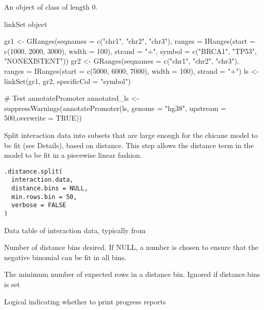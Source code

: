 \documentclass[letterpaper]{book}
\begin{document}
%
\begin{Format}
An object of class  of length 0.
\end{Format}
%
\begin{Value}
linkSet object
\end{Value}
%
\begin{Examples}
\begin{ExampleCode}
  gr1 <- GRanges(seqnames = c("chr1", "chr2", "chr3"),
                ranges = IRanges(start = c(1000, 2000, 3000), width = 100),
                strand = "+", symbol = c("BRCA1", "TP53", "NONEXISTENT"))
  gr2 <- GRanges(seqnames = c("chr1", "chr2", "chr3"),
                ranges = IRanges(start = c(5000, 6000, 7000), width = 100),
                strand = "+")
  ls <- linkSet(gr1, gr2, specificCol = "symbol")

  # Test annotatePromoter
  annotated_ls <- suppressWarnings(annotatePromoter(ls, genome = "hg38", upstream = 500,overwrite = TRUE))


\end{ExampleCode}
\end{Examples}
%
\begin{Description}
Split interaction data into subsets that are large enough for the chicane model to be fit (see Details),
based on distance. This step allows the distance term in the model to be fit in a piecewise linear fashion.
\end{Description}
%
\begin{Usage}
\begin{verbatim}
.distance.split(
  interaction.data,
  distance.bins = NULL,
  min.rows.bin = 50,
  verbose = FALSE
)
\end{verbatim}
\end{Usage}
%
\begin{Arguments}
\begin{ldescription}
\item[\code{interaction.data}] Data table of interaction data, typically from 

\item[\code{distance.bins}] Number of distance bins desired. If NULL, a number is chosen to ensure that the negative binomial can be fit in all bins.

\item[\code{min.rows.bin}] The minimum number of expected rows in a distance bin. Ignored if distance.bins is set

\item[\code{verbose}] Logical indicating whether to print progress reports
\end{ldescription}
\end{Arguments}
\end{document}
